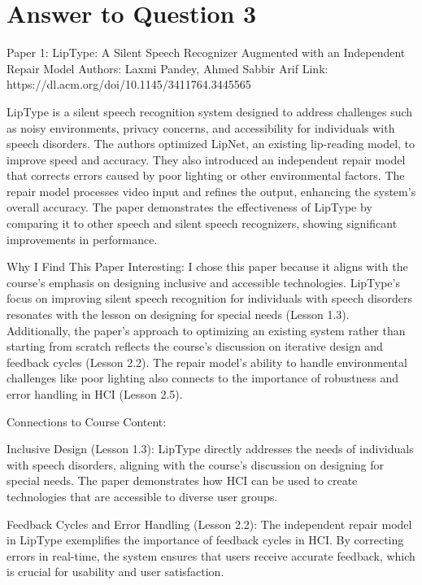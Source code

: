 \documentclass[
	letterpaper, %
]{jdf}
\begin{document}
\section{Answer to Question 3}
Paper 1: LipType: A Silent Speech Recognizer Augmented with an Independent Repair Model 
\newline Authors: Laxmi Pandey, Ahmed Sabbir Arif
\newline Link: https://dl.acm.org/doi/10.1145/3411764.3445565

LipType is a silent speech recognition system designed to address challenges such as noisy environments, privacy concerns, and accessibility for individuals with speech disorders. The authors optimized LipNet, an existing lip-reading model, to improve speed and accuracy. They also introduced an independent repair model that corrects errors caused by poor lighting or other environmental factors. The repair model processes video input and refines the output, enhancing the system’s overall accuracy. The paper demonstrates the effectiveness of LipType by comparing it to other speech and silent speech recognizers, showing significant improvements in performance.

Why I Find This Paper Interesting:
I chose this paper because it aligns with the course’s emphasis on designing inclusive and accessible technologies. LipType’s focus on improving silent speech recognition for individuals with speech disorders resonates with the lesson on designing for special needs (Lesson 1.3). Additionally, the paper’s approach to optimizing an existing system rather than starting from scratch reflects the course’s discussion on iterative design and feedback cycles (Lesson 2.2). The repair model’s ability to handle environmental challenges like poor lighting also connects to the importance of robustness and error handling in HCI (Lesson 2.5).

Connections to Course Content:

Inclusive Design (Lesson 1.3): LipType directly addresses the needs of individuals with speech disorders, aligning with the course’s discussion on designing for special needs. The paper demonstrates how HCI can be used to create technologies that are accessible to diverse user groups.

Feedback Cycles and Error Handling (Lesson 2.2): The independent repair model in LipType exemplifies the importance of feedback cycles in HCI. By correcting errors in real-time, the system ensures that users receive accurate feedback, which is crucial for usability and user satisfaction.
\end{document}
